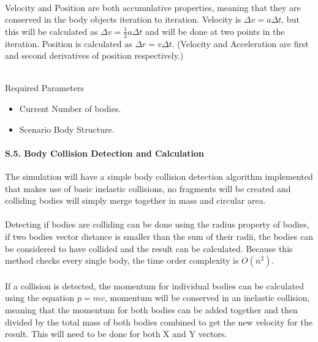 \paragraph{}
Velocity and Position are both accumulative properties, meaning that they are conserved in the body objects iteration to iteration. Velocity is $\Delta{v}=a\Delta{t}$, but this will be calculated as $\Delta{v}=\frac{1}{2}a\Delta{t}$ and will be done at two points in the iteration. Position is calculated as $\Delta{r}=v\Delta{t}$. (Velocity and Acceleration are first and second derivatives of position respectively.) \\\

Required Parameters
\begin{itemize}
\item Current Number of bodies.
\item Scenario Body Structure.
\end{itemize}

\paragraph{S.5. Body Collision Detection and Calculation}
The simulation will have a simple body collision detection algorithm implemented that makes use of basic inelastic collisions, no fragments will be created and colliding bodies will simply merge together in mass and circular area.

\paragraph{}
Detecting if bodies are colliding can be done using the radius property of bodies, if two bodies vector distance is smaller than the sum of their radii, the bodies can be considered to have collided and the result can be calculated. Because this method checks every single body, the time order complexity is $O(n^2)$.

\paragraph{}
If a collision is detected, the momentum for individual bodies can be calculated using the equation $p=mv$, momentum will be conserved in an inelastic collision, meaning that the momentum for both bodies can be added together and then divided by the total mass of both bodies combined to get the new velocity for the result. This will need to be done for both X and Y vectors.

